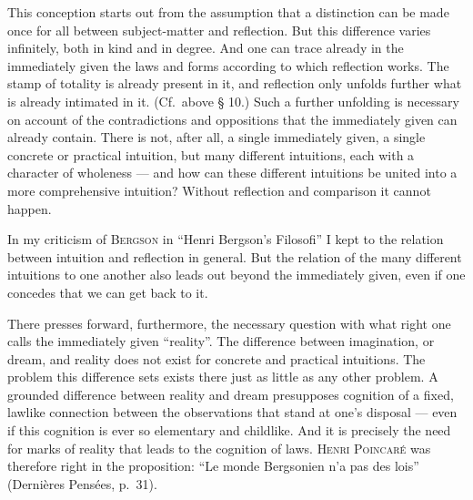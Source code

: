 \documentclass[12pt]{book}
\begin{document}
This conception starts out from the assumption that a distinction can be made once
for all between subject-matter and reflection. But this difference varies
infinitely, both in kind and in degree. And one can trace already in the
immediately given the laws and forms according to which reflection works. The
stamp of totality is already present in it, and reflection only unfolds further
what is already intimated in it. (Cf.\ above § 10.) Such a further unfolding is
necessary on account of the contradictions and oppositions that the immediately
given can already contain. There is not, after all, a single immediately given, a
single concrete or practical intuition, but many different intuitions, each with a
character of wholeness --- and how can these different intuitions be united into a
more comprehensive intuition? Without reflection and comparison it cannot happen.

In my criticism of \textsc{Bergson} in ``Henri Bergson's Filosofi'' I kept to the
relation between intuition and reflection in general. But the relation of the many
different intuitions to one another also leads out beyond the immediately given,
even if one concedes that we can get back to it.

There presses forward, furthermore, the necessary question with what right one
calls the immediately given ``reality''. The difference between imagination, or
dream, and reality does not exist for concrete and practical intuitions. The
problem this difference sets exists there just as little as any other problem. A
grounded difference between reality and dream presupposes cognition of a fixed,
lawlike connection between the observations that stand at one's disposal --- even
if this cognition is ever so elementary and childlike. And it is precisely the need
for marks of reality that leads to the cognition of laws. \textsc{Henri Poincaré}
was therefore right in the proposition: ``Le monde Bergsonien n'a pas des lois''
(Dernières Pensées, p.\ 31).
\end{document}
